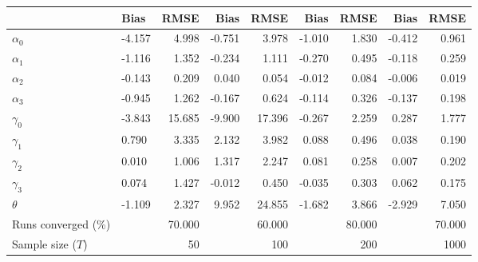 
\begin{tabular}[t]{llrrrrrrr}
\toprule
  & Bias & RMSE & Bias & RMSE & Bias & RMSE & Bias & RMSE\\
\midrule
$\alpha_{0}$ & -4.157 & 4.998 & -0.751 & 3.978 & -1.010 & 1.830 & -0.412 & 0.961\\
$\alpha_{1}$ & -1.116 & 1.352 & -0.234 & 1.111 & -0.270 & 0.495 & -0.118 & 0.259\\
$\alpha_{2}$ & -0.143 & 0.209 & 0.040 & 0.054 & -0.012 & 0.084 & -0.006 & 0.019\\
$\alpha_{3}$ & -0.945 & 1.262 & -0.167 & 0.624 & -0.114 & 0.326 & -0.137 & 0.198\\
$\gamma_{0}$ & -3.843 & 15.685 & -9.900 & 17.396 & -0.267 & 2.259 & 0.287 & 1.777\\
$\gamma_{1}$ & 0.790 & 3.335 & 2.132 & 3.982 & 0.088 & 0.496 & 0.038 & 0.190\\
$\gamma_{2}$ & 0.010 & 1.006 & 1.317 & 2.247 & 0.081 & 0.258 & 0.007 & 0.202\\
$\gamma_{3}$ & 0.074 & 1.427 & -0.012 & 0.450 & -0.035 & 0.303 & 0.062 & 0.175\\
$\theta$ & -1.109 & 2.327 & 9.952 & 24.855 & -1.682 & 3.866 & -2.929 & 7.050\\
Runs converged (\%) &  & 70.000 &  & 60.000 &  & 80.000 &  & 70.000\\
Sample size ($T$) &  & 50 &  & 100 &  & 200 &  & 1000\\
\bottomrule
\end{tabular}
